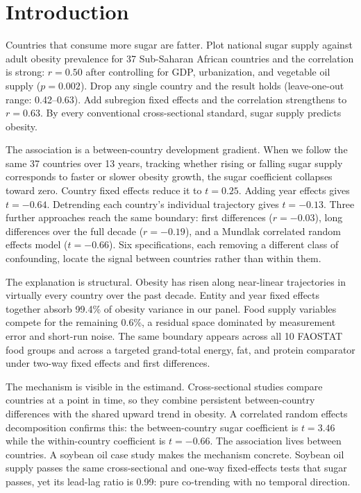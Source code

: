 \section{Introduction}

Countries that consume more sugar are fatter. Plot national sugar supply against adult obesity prevalence for 37 Sub-Saharan African countries and the correlation is strong: $r = 0.50$ after controlling for GDP, urbanization, and vegetable oil supply ($p = 0.002$). Drop any single country and the result holds (leave-one-out range: 0.42--0.63). Add subregion fixed effects and the correlation strengthens to $r = 0.63$. By every conventional cross-sectional standard, sugar supply predicts obesity.

The association is a between-country development gradient. When we follow the same 37 countries over 13 years, tracking whether rising or falling sugar supply corresponds to faster or slower obesity growth, the sugar coefficient collapses toward zero. Country fixed effects reduce it to $t = 0.25$. Adding year effects gives $t = -0.64$. Detrending each country's individual trajectory gives $t = -0.13$. Three further approaches reach the same boundary: first differences ($r = -0.03$), long differences over the full decade ($r = -0.19$), and a Mundlak correlated random effects model ($t = -0.66$). Six specifications, each removing a different class of confounding, locate the signal between countries rather than within them.

The explanation is structural. Obesity has risen along near-linear trajectories in virtually every country over the past decade. Entity and year fixed effects together absorb 99.4\% of obesity variance in our panel. Food supply variables compete for the remaining 0.6\%, a residual space dominated by measurement error and short-run noise. The same boundary appears across all 10 FAOSTAT food groups and across a targeted grand-total energy, fat, and protein comparator under two-way fixed effects and first differences.

The mechanism is visible in the estimand. Cross-sectional studies compare countries at a point in time, so they combine persistent between-country differences with the shared upward trend in obesity. A correlated random effects decomposition confirms this: the between-country sugar coefficient is $t = 3.46$ while the within-country coefficient is $t = -0.66$. The association lives between countries. A soybean oil case study makes the mechanism concrete. Soybean oil supply passes the same cross-sectional and one-way fixed-effects tests that sugar passes, yet its lead-lag ratio is 0.99: pure co-trending with no temporal direction.

